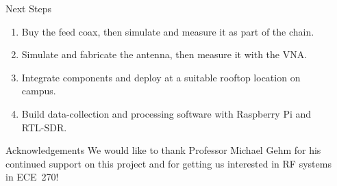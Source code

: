 \documentclass[final]{beamer}
\newlength{\colwidth}
\newcommand{\outercolumn}{\begin{column}{\posteredge}\end{column}}
\begin{document}
\begin{frame}[t]
\begin{columns}[t, totalwidth=\paperwidth]
\begin{column}{\colwidth}
      \begin{block}{Next Steps}
        \begin{enumerate}
          \item Buy the feed coax, then simulate and measure it as part of the chain.
          \item Simulate and fabricate the antenna, then measure it with the VNA.
          \item Integrate components and deploy at a suitable rooftop location on campus.
          \item Build data-collection and processing software with Raspberry Pi and RTL-SDR. 
        \end{enumerate}
      \end{block}

      \begin{block}{Acknowledgements}
        We would like to thank Professor Michael Gehm for his continued support on this project and for getting us interested in RF systems in ECE~270!
      \end{block}

    \end{column}

    \outercolumn

  \end{columns}
\end{frame}
\end{document}
